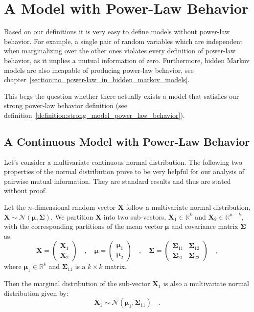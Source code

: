 \documentclass[../../main.tex]{subfiles}
\begin{document}
\chapter{A Model with Power-Law Behavior}
Based on our definitions it is very easy to define models without power-law behavior. For example, a single pair of random variables which are independent when marginalizing over the other ones violates every definition of power-law behavior, as it implies a mutual information of zero. Furthermore, hidden Markov models are also incapable of producing power-law behavior, see chapter~\ref{section:no_power-law_in_hidden_markov_models}.

This begs the question whether there actually exists a model that satisfies our strong power-law behavior definition (see definition~\ref{definition:strong_model_power_law_behavior}).

\section{A Continuous Model with Power-Law Behavior}
Let's consider a multivariate continuous normal distribution. The following two properties of the normal distribution prove to be very helpful for our analysis of pairwise mutual information. They are standard results and thus are stated without proof.

\begin{proposition}
    \label{proposition:marginal_distributions_of_a_normal_distribution}
    Let the $n$-dimensional random vector $\bm{X}$ follow a multivariate normal distribution, $\bm{X} \sim \mathcal{N}(\bm{\mu}, \bm{\Sigma})$. We partition $\bm{X}$ into two sub-vectors, $\bm{X}_1 \in \mathbb{R}^k$ and $\bm{X}_2 \in \mathbb{R}^{n-k}$, with the corresponding partitions of the mean vector $\bm{\mu}$ and covariance matrix $\bm{\Sigma}$ as:
    \[
        \bm{X} = \begin{pmatrix} \bm{X}_1 \\ \bm{X}_2 \end{pmatrix} \quad , \quad 
        \bm{\mu} = \begin{pmatrix} \bm{\mu}_1 \\ \bm{\mu}_2 \end{pmatrix} \quad , \quad 
        \bm{\Sigma} = \begin{pmatrix} \bm{\Sigma}_{11} & \bm{\Sigma}_{12} \\ \bm{\Sigma}_{21} & \bm{\Sigma}_{22} \end{pmatrix} \quad ,
    \]
    where $\bm{\mu}_1 \in \mathbb{R}^k$ and $\bm{\Sigma}_{11}$ is a $k \times k$ matrix.
    
    Then the marginal distribution of the sub-vector $\bm{X}_1$ is also a multivariate normal distribution given by:
    \[
        \bm{X}_1 \sim \mathcal{N}(\bm{\mu}_1, \bm{\Sigma}_{11}) \quad .
    \]
\end{proposition}
\end{document}
